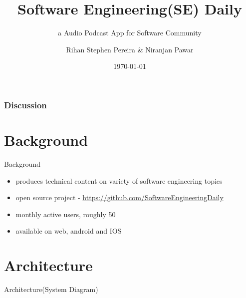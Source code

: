 \documentclass[9pt]{beamer}
\title{Software Engineering(SE) Daily}
\subtitle{a Audio Podcast App for Software Community}
\author{Rihan Stephen Pereira \& Niranjan Pawar }
\institute[California State University, Channel Islands]
{
  COMP 590 - Android Development, Fall 2018\\
  Department of Computer Science\\
  California State University, Channel Islands
}
\date{\today}
\begin{document}
\begin{frame}[plain]
  \frametitle{}
  \titlepage
\end{frame}

\begin{frame}[plain]
  \frametitle{Discussion}
  \tableofcontents
\end{frame}


\section{Background}
\begin{frame}{Background}
  \begin{itemize}
  \item produces technical content on variety of software engineering topics
    \pause
  \item  open source project - \href{https://github.com/SoftwareEngineeringDaily}{https://github.com/SoftwareEngineeringDaily}
    \pause
  \item monthly active users, roughly 50
    \pause
  \item available on web, android and IOS
  \end{itemize}
\end{frame}



\section{Architecture}
\begin{frame}{Architecture(System Diagram)}
\end{frame}
\end{document}
